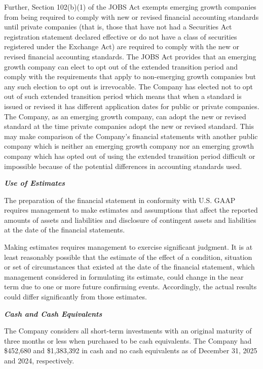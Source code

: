 \documentclass[11pt,a4paper]{article}
\begin{document}
Further, Section 102(b)(1) of the JOBS Act exempts emerging growth companies from being required to comply with new or revised financial accounting standards until private companies (that is, those that have not had a Securities Act registration statement declared effective or do not have a class of securities registered under the Exchange Act) are required to comply with the new or revised financial accounting standards. The JOBS Act provides that an emerging growth company can elect to opt out of the extended transition period and comply with the requirements that apply to non-emerging growth companies but any such election to opt out is irrevocable. The Company has elected not to opt out of such extended transition period which means that when a standard is issued or revised it has different application dates for public or private companies. The Company, as an emerging growth company, can adopt the new or revised standard at the time private companies adopt the new or revised standard. This may make comparison of the Company's financial statements with another public company which is neither an emerging growth company nor an emerging growth company which has opted out of using the extended transition period difficult or impossible because of the potential differences in accounting standards used.

\textit{\textbf{Use of Estimates}}

The preparation of the financial statement in conformity with U.S. GAAP requires management to make estimates and assumptions that affect the reported amounts of assets and liabilities and disclosure of contingent assets and liabilities at the date of the financial statements.

Making estimates requires management to exercise significant judgment. It is at least reasonably possible that the estimate of the effect of a condition, situation or set of circumstances that existed at the date of the financial statement, which management considered in formulating its estimate, could change in the near term due to one or more future confirming events. Accordingly, the actual results could differ significantly from those estimates.

\textit{\textbf{Cash and Cash Equivalents}}

The Company considers all short-term investments with an original maturity of three months or less when purchased to be cash equivalents. The Company had \$452,680 and \$1,383,392 in cash and no cash equivalents as of December 31, 2025 and 2024, respectively.
\end{document}
